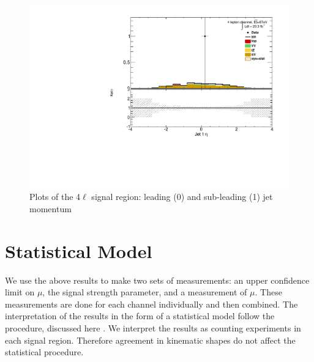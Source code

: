 \begin{figure}[!htbp]
\begin{minipage}[h]{0.5\textwidth}
  \end{minipage}\hfill
  \begin{minipage}[h]{0.5\textwidth}
    \centering \includegraphics[width=\textwidth]{figs/results/plotCand_4lep_Jet1Eta}
  \end{minipage}\hfill
\caption{Plots of the 4$\ell$ signal region: leading (0) and sub-leading (1) jet momentum}  
\label{figure:results_4l_jet}  
\end{figure} 



\section{Statistical Model}

We use the above results to make two sets of measurements: an upper confidence limit on $\mu$, the signal strength parameter, and a measurement of $\mu$. These measurements are done for each channel individually and then combined. The interpretation of the results in the form of a statistical model follow the procedure, discussed here \cite{asym}. We interpret the results as counting experiments in each signal region. Therefore agreement in kinematic shapes do not affect the statistical procedure. 


